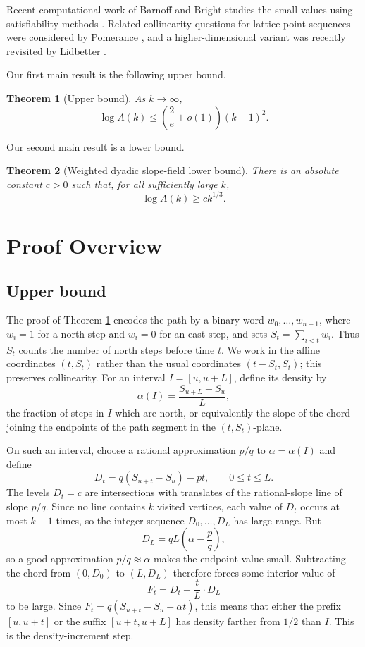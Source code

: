 \documentclass[10pt,a4paper]{amsart}
\newtheorem{theorem}{Theorem}[section]
\newcommand{\1}{\mathbf 1}
\begin{document}
\bigskip
\noindent
Recent computational work of Barnoff and Bright studies the small values using satisfiability methods \cite{BarnoffBright}. Related collinearity questions for lattice-point sequences were considered by Pomerance \cite{Pomerance}, and a higher-dimensional variant was recently revisited by Lidbetter \cite{Lidbetter}.

\bigskip
\noindent
Our first main result is the following upper bound.

\begin{theorem}[Upper bound]\label{thm:upper_intro}
As $k\to\infty$,
\[
\log A(k)\le \left(\frac{2}{e}+o(1)\right)(k-1)^2.
\]
\end{theorem}

\smallskip
\noindent
Our second main result is a lower bound.


\begin{theorem}[Weighted dyadic slope-field lower bound]\label{thm:lower_intro}
There is an absolute constant $c>0$ such that, for all sufficiently large $k$,
\[
\log A(k)\ge c k^{1/3}.
\]
\end{theorem}


\section{Proof Overview}\label{sec:overview}

\subsection{Upper bound}

The proof of Theorem \ref{thm:upper_intro} encodes the path by a binary word $w_0,\ldots,w_{n-1}$, where $w_i=1$ for a north step and $w_i=0$ for an east step, and sets $S_t=\sum_{i<t}w_i$. Thus $S_t$ counts the number of north steps before time $t$. We work in the affine coordinates $(t,S_t)$ rather than the usual coordinates $(t-S_t,S_t)$; this preserves collinearity. For an interval $I=[u,u+L]$, define its density by
\[
\alpha(I)=\frac{S_{u+L}-S_u}{L},
\]
the fraction of steps in $I$ which are north, or equivalently the slope of the chord joining the endpoints of the path segment in the $(t,S_t)$-plane.

\bigskip
\noindent
On such an interval, choose a rational approximation $p/q$ to $\alpha=\alpha(I)$ and define
\[
D_t=q(S_{u+t}-S_u)-pt,\qquad 0\le t\le L.
\]
The levels $D_t=c$ are intersections with translates of the rational-slope line of slope $p/q$. Since no line contains $k$ visited vertices, each value of $D_t$ occurs at most $k-1$ times, so the integer sequence $D_0,\ldots,D_L$ has large range. But
\[
D_L=qL\left(\alpha-\frac pq\right),
\]
so a good approximation $p/q\approx\alpha$ makes the endpoint value small. Subtracting the chord from $(0,D_0)$ to $(L,D_L)$ therefore forces some interior value of
\[
F_t=D_t-\frac{t}{L}\cdot D_L
\]
to be large. Since $F_t=q(S_{u+t}-S_u-\alpha t)$, this means that either the prefix $[u,u+t]$ or the suffix $[u+t,u+L]$ has density farther from $1/2$ than $I$. This is the density-increment step.
\end{document}
